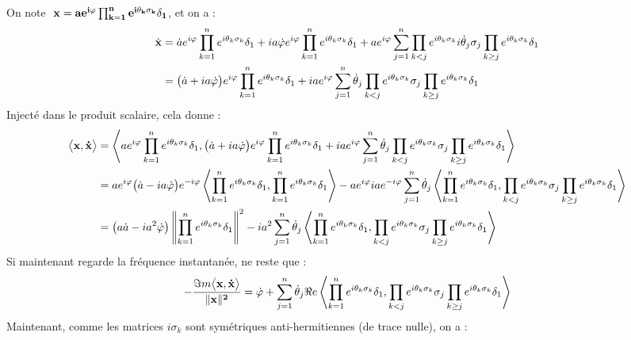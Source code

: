 \begin{demo}
	On note $\ \bf{x} = ae^{i\varphi}\prod_{k=1}^n e^{i\theta_k\sigma_k}\delta_1$, et on a :
	\begin{align*}
		\dot{\bf{x}} &= \dot{a}e^{i\varphi}\prod_{k=1}^n e^{i\theta_k\sigma_k}\delta_1 + ia\dot{\varphi} e^{i\varphi}\prod_{k=1}^n e^{i\theta_k\sigma_k}\delta_1 + ae^{i\varphi}\sum_{j=1}^n \prod_{k<j} e^{i\theta_k\sigma_k} i\dot{\theta}_j\sigma_j \prod_{k\geq j} e^{i\theta_k\sigma_k}\delta_1 \\
		&= \big(\dot{a} + ia\dot{\varphi}\big) e^{i\varphi} \prod_{k=1}^n e^{i\theta_k\sigma_k}\delta_1 + iae^{i\varphi}\sum_{j=1}^n \dot{\theta}_j \prod_{k<j} e^{i\theta_k\sigma_k} \sigma_j \prod_{k\geq j} e^{i\theta_k\sigma_k}\delta_1
	\end{align*}
	Injecté dans le produit scalaire, cela donne :
	\begin{align*}
		\big\langle \bf{x}, \dot{\bf{x}}\big\rangle &= \left\langle ae^{i\varphi}\prod_{k=1}^n e^{i\theta_k\sigma_k}\delta_1, \big(\dot{a} + ia\dot{\varphi}\big) e^{i\varphi} \prod_{k=1}^n e^{i\theta_k\sigma_k}\delta_1 + iae^{i\varphi}\sum_{j=1}^n \dot{\theta}_j \prod_{k<j} e^{i\theta_k\sigma_k} \sigma_j \prod_{k\geq j} e^{i\theta_k\sigma_k}\delta_1 \right\rangle \\
			&= ae^{i\varphi}\big(\dot{a} - ia\dot{\varphi}\big) e^{-i\varphi} \left\langle \prod_{k=1}^n e^{i\theta_k\sigma_k}\delta_1, \prod_{k=1}^n e^{i\theta_k\sigma_k}\delta_1 \right\rangle -
			ae^{i\varphi}iae^{-i\varphi}\sum_{j=1}^n \dot{\theta}_j \left\langle \prod_{k=1}^n e^{i\theta_k\sigma_k}\delta_1, \prod_{k<j} e^{i\theta_k\sigma_k} \sigma_j \prod_{k\geq j} e^{i\theta_k\sigma_k}\delta_1 \right\rangle \\
			&= \big(a\dot{a} - ia^2\dot{\varphi}\big) \left\| \prod_{k=1}^n e^{i\theta_k\sigma_k}\delta_1 \right\|^2 -  ia^2\sum_{j=1}^n \dot{\theta}_j \left\langle \prod_{k=1}^n e^{i\theta_k\sigma_k}\delta_1, \prod_{k<j} e^{i\theta_k\sigma_k} \sigma_j \prod_{k\geq j} e^{i\theta_k\sigma_k}\delta_1 \right\rangle
	\end{align*}
	Si maintenant regarde la fréquence instantanée, ne reste que :
	\[-\frac{\Im m\big\langle \bf{x}, \dot{\bf{x}}\big\rangle}{\|\bf{x}\|^2} = \dot{\varphi} + \sum_{j=1}^n \dot{\theta}_j \Re e\left\langle \prod_{k=1}^n e^{i\theta_k\sigma_k}\delta_1, \prod_{k<j} e^{i\theta_k\sigma_k} \sigma_j \prod_{k\geq j} e^{i\theta_k\sigma_k}\delta_1 \right\rangle\]
	Maintenant, comme les matrices $i\sigma_k$ sont symétriques anti-hermitiennes (de trace nulle), on a :
	\begin{align*}

\end{align*}
\end{demo}
